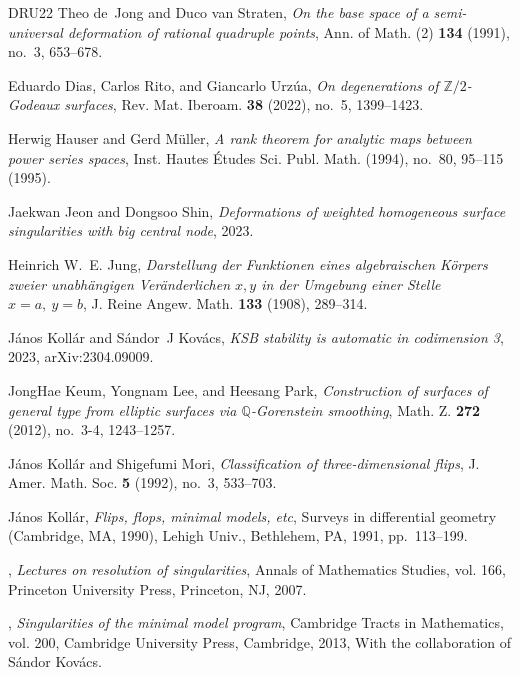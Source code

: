 \documentclass{amsart}
\theoremstyle{definition}
\theoremstyle{remark}
\begin{document}
\begin{thebibliography}{DRU22}
Theo de~Jong and Duco van Straten, \emph{On the base space of a semi-universal
  deformation of rational quadruple points}, Ann. of Math. (2) \textbf{134}
  (1991), no.~3, 653--678. 

Eduardo Dias, Carlos Rito, and Giancarlo Urz\'{u}a, \emph{On degenerations of
  {$\mathbb{Z}/2$}-{G}odeaux surfaces}, Rev. Mat. Iberoam. \textbf{38} (2022),
  no.~5, 1399--1423. 

Herwig Hauser and Gerd M{\"u}ller, \emph{A rank theorem for analytic maps
  between power series spaces}, Inst. Hautes \'Etudes Sci. Publ. Math. (1994),
  no.~80, 95--115 (1995). 

Jaekwan Jeon and Dongsoo Shin, \emph{Deformations of weighted homogeneous
  surface singularities with big central node}, 2023.

Heinrich W.~E. Jung, \emph{Darstellung der {F}unktionen eines algebraischen
  {K}\"orpers zweier unabh\"angigen {V}er\"anderlichen {$x,y$} in der
  {U}mgebung einer {S}telle {$x=a,\ y=b$}}, J. Reine Angew. Math. \textbf{133}
  (1908), 289--314. 

J{\'a}nos Koll{\'a}r and S{\'a}ndor~J Kov{\'a}cs, \emph{{KSB} stability is
  automatic in codimension 3}, 2023, arXiv:2304.09009.

JongHae Keum, Yongnam Lee, and Heesang Park, \emph{Construction of surfaces of
  general type from elliptic surfaces via {$\mathbb{Q}$}-{G}orenstein
  smoothing}, Math. Z. \textbf{272} (2012), no.~3-4, 1243--1257. 

J{\'a}nos Koll{\'a}r and Shigefumi Mori, \emph{Classification of
  three-dimensional flips}, J. Amer. Math. Soc. \textbf{5} (1992), no.~3,
  533--703. 

J{\'a}nos Koll{\'a}r, \emph{Flips, flops, minimal models, etc}, Surveys in
  differential geometry ({C}ambridge, {MA}, 1990), Lehigh Univ., Bethlehem, PA,
  1991, pp.~113--199. 

\bysame, \emph{Lectures on resolution of singularities}, Annals of Mathematics
  Studies, vol. 166, Princeton University Press, Princeton, NJ, 2007.

\bysame, \emph{Singularities of the minimal model program}, Cambridge Tracts in
  Mathematics, vol. 200, Cambridge University Press, Cambridge, 2013, With the
  collaboration of S{\'a}ndor Kov{\'a}cs.


\end{thebibliography}
\end{document}
